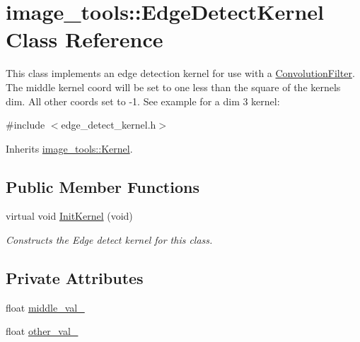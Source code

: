 \hypertarget{classimage__tools_1_1EdgeDetectKernel}{}\section{image\+\_\+tools\+:\+:Edge\+Detect\+Kernel Class Reference}
\label{classimage__tools_1_1EdgeDetectKernel}


This class implements an edge detection kernel for use with a \hyperlink{classimage__tools_1_1ConvolutionFilter}{Convolution\+Filter}. The middle kernel coord will be set to one less than the square of the kernel\textquotesingle{}s dim. All other coords set to -\/1. See example for a dim 3 kernel\+:  




{\ttfamily \#include $<$edge\+\_\+detect\+\_\+kernel.\+h$>$}



Inherits \hyperlink{classimage__tools_1_1Kernel}{image\+\_\+tools\+::\+Kernel}.

\subsection*{Public Member Functions}
\begin{DoxyCompactItemize}
\item 
virtual void \hyperlink{classimage__tools_1_1EdgeDetectKernel_aeff98b8f4456d96ca44987b3cec500b8}{Init\+Kernel} (void)\hypertarget{classimage__tools_1_1EdgeDetectKernel_aeff98b8f4456d96ca44987b3cec500b8}{}\label{classimage__tools_1_1EdgeDetectKernel_aeff98b8f4456d96ca44987b3cec500b8}

\begin{DoxyCompactList}\small\item\em Constructs the Edge detect kernel for this class. \end{DoxyCompactList}\end{DoxyCompactItemize}
\subsection*{Private Attributes}
\begin{DoxyCompactItemize}
\item 
float \hyperlink{classimage__tools_1_1EdgeDetectKernel_ab10b3421f714693466587355c3edff1d}{middle\+\_\+val\+\_\+}
\item 
float \hyperlink{classimage__tools_1_1EdgeDetectKernel_a7022ded313828624cfd89fa4d2a231ce}{other\+\_\+val\+\_\+}
\end{DoxyCompactItemize}
